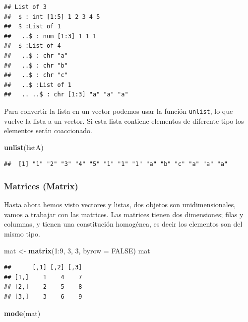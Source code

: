 \documentclass[]{article}
\newenvironment{Shaded}{\begin{snugshade}}{\end{snugshade}}
\newcommand{\KeywordTok}[1]{\textcolor[rgb]{0.13,0.29,0.53}{\textbf{{#1}}}}
\newcommand{\DataTypeTok}[1]{\textcolor[rgb]{0.13,0.29,0.53}{{#1}}}
\newcommand{\DecValTok}[1]{\textcolor[rgb]{0.00,0.00,0.81}{{#1}}}
\newcommand{\StringTok}[1]{\textcolor[rgb]{0.31,0.60,0.02}{{#1}}}
\newcommand{\OtherTok}[1]{\textcolor[rgb]{0.56,0.35,0.01}{{#1}}}
\newcommand{\NormalTok}[1]{{#1}}
\begin{document}
\begin{verbatim}
## List of 3
##  $ : int [1:5] 1 2 3 4 5
##  $ :List of 1
##   ..$ : num [1:3] 1 1 1
##  $ :List of 4
##   ..$ : chr "a"
##   ..$ : chr "b"
##   ..$ : chr "c"
##   ..$ :List of 1
##   .. ..$ : chr [1:3] "a" "a" "a"
\end{verbatim}

Para convertir la lista en un vector podemos usar la función
\texttt{unlist}, lo que vuelve la lista a un vector. Si esta lista
contiene elementos de diferente tipo los elementos serán coaccionado.

\begin{Shaded}
\begin{Highlighting}[]
\KeywordTok{unlist}\NormalTok{(listA)}
\end{Highlighting}
\end{Shaded}

\begin{verbatim}
##  [1] "1" "2" "3" "4" "5" "1" "1" "1" "a" "b" "c" "a" "a" "a"
\end{verbatim}

\subsubsection{Matrices (Matrix)}\label{matrices-matrix}

Hasta ahora hemos visto vectores y listas, dos objetos son
unidimensionales, vamos a trabajar con las matrices. Las matrices tienen
dos dimensiones; filas y columnas, y tienen una constitución homogénea,
es decir los elementos son del mismo tipo.

\begin{Shaded}
\begin{Highlighting}[]
\NormalTok{mat <-}\StringTok{ }\KeywordTok{matrix}\NormalTok{(}\DecValTok{1}\NormalTok{:}\DecValTok{9}\NormalTok{, }\DecValTok{3}\NormalTok{, }\DecValTok{3}\NormalTok{, }\DataTypeTok{byrow =} \OtherTok{FALSE}\NormalTok{)}
\NormalTok{mat}
\end{Highlighting}
\end{Shaded}

\begin{verbatim}
##      [,1] [,2] [,3]
## [1,]    1    4    7
## [2,]    2    5    8
## [3,]    3    6    9
\end{verbatim}

\begin{Shaded}
\begin{Highlighting}[]
\KeywordTok{mode}\NormalTok{(mat)}
\end{Highlighting}
\end{Shaded}
\end{document}
